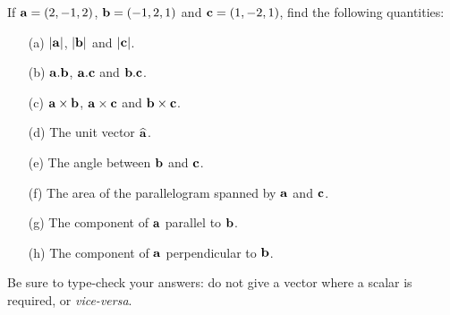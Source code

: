 \documentclass[a4paper]{amsart}
\begin{document}
\begin{exercise}
 If $\mathbf{a}=(2,-1, 2)$, $\mathbf{b}=(-1, 2, 1)$ and $\mathbf{c}=(1,-2, 1)$, find the
 following quantities:
 \begin{itemize}
  \item[(a)] $|\mathbf{a}|$, $|\mathbf{b}|$ and $|\mathbf{c}|$.
  \item[(b)] $\mathbf{a}.\mathbf{b}$, $\mathbf{a}.\mathbf{c}$ and $\mathbf{b}.\mathbf{c}$.
  \item[(c)] $\mathbf{a}\times\mathbf{b}$,  $\mathbf{a}\times\mathbf{c}$ and  $\mathbf{b}\times\mathbf{c}$.
  \item[(d)] The unit vector $\widehat{\mathbf{a}}$.
  \item[(e)] The angle between $\mathbf{b}$ and $\mathbf{c}$.
  \item[(f)] The area of the parallelogram spanned by $\mathbf{a}$ and
   $\mathbf{c}$.
  \item[(g)] The component of $\mathbf{a}$ parallel to $\mathbf{b}$.
  \item[(h)] The component of $\mathbf{a}$ perpendicular to $\mathbf{b}$.
 \end{itemize}
 Be sure to type-check your answers: do not give a vector where a
 scalar is required, or \emph{vice-versa}.
\end{exercise}
\end{document}
